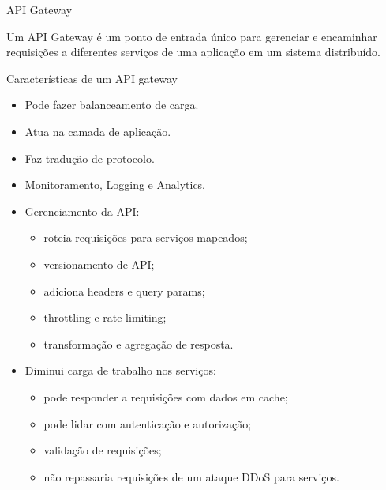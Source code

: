 \begin{frame}[fragile]{API Gateway}
    \begin{itemize}%
        Um API Gateway é um ponto de entrada único para gerenciar e encaminhar requisições a diferentes serviços de uma aplicação em um sistema distribuído.
    \end{itemize}
\end{frame}


\begin{frame}[fragile]{Características de um API gateway}
    \begin{itemize}%
        \item Pode fazer balanceamento de carga.
        \item Atua na camada de aplicação.
        \item Faz tradução de protocolo.
        \item Monitoramento, Logging e Analytics.
        \item Gerenciamento da API:
            \begin{itemize}
                \item roteia requisições para serviços mapeados;
                \item versionamento de API;
                \item adiciona headers e query params;
                \item throttling e rate limiting;
                \item transformação e agregação de resposta.
            \end{itemize}
        \item Diminui carga de trabalho nos serviços:
            \begin{itemize}
                \item pode responder a requisições com dados em cache;
                \item pode lidar com autenticação e autorização;
                \item validação de requisições;
                \item não repassaria requisições de um ataque DDoS para serviços.
            \end{itemize}
    \end{itemize}
\end{frame}


